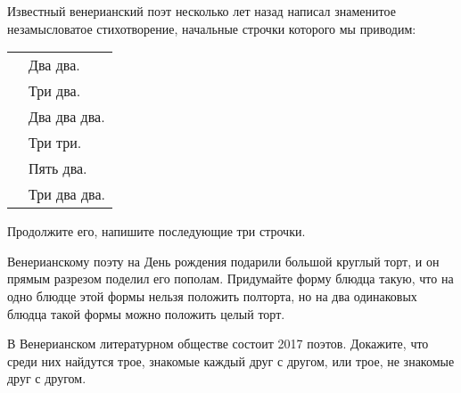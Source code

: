 ﻿
\begin{itemize}

\itA Известный венерианский поэт несколько лет назад написал знаменитое незамысловатое стихотворение, начальные строчки которого мы приводим:

\begin{tabular}{ll}
\hspace{2.4cm} & Два два. \\
	& Три два. \\
	& Два два два. \\
	& Три три. \\
	& Пять два. \\
	& Три два два.
\end{tabular}

Продолжите его, напишите последующие три строчки.

\itB Венерианскому поэту на День рождения подарили большой круглый торт, и он прямым разрезом поделил его пополам. Придумайте форму блюдца такую, что на одно блюдце этой формы нельзя положить полторта, но на два одинаковых блюдца такой формы можно положить целый торт.

\itC В Венерианском литературном обществе состоит 2017 поэтов. Докажите, что среди них найдутся трое, знакомые каждый друг с другом, или трое, не знакомые друг с другом.
\end{itemize}